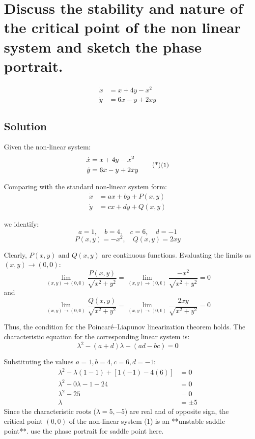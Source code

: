 \section{Discuss the stability and nature of the critical point of the non linear system and sketch the phase portrait.}
\begin{align*}
        \dot{x} &= x + 4y - x^2 \\
        \dot{y} &= 6x - y + 2xy
    \end{align*}
\subsection*{Solution}

Given the non-linear system:
\begin{equation}
    \begin{aligned}
        \dot{x} &= x + 4y - x^2 \\
        \dot{y} &= 6x - y + 2xy
    \end{aligned} \sidenote{1}
\end{equation}

Comparing with the standard non-linear system form:
\begin{align*}
    \dot{x} &= ax + by + P(x, y) \\
    \dot{y} &= cx + dy + Q(x, y)
\end{align*}

we identify:
\[a = 1, \quad b = 4, \quad c = 6, \quad d = -1\]
\[P(x, y) = -x^2, \quad Q(x, y) = 2xy\]

\noindent Clearly, $P(x, y)$ and $Q(x, y)$ are continuous functions.
Evaluating the limits as $(x, y) \to (0,0)$:
\[\lim_{(x, y) \to (0, 0)} \frac{P(x, y)}{\sqrt{x^2 + y^2}} = \lim_{(x, y) \to (0, 0)} \frac{-x^2}{\sqrt{x^2 + y^2}} = 0\]
and
\[\lim_{(x, y) \to (0, 0)} \frac{Q(x, y)}{\sqrt{x^2 + y^2}} = \lim_{(x, y) \to (0, 0)} \frac{2xy}{\sqrt{x^2 + y^2}} = 0\]

Thus, the condition for the Poincaré–Liapunov linearization theorem holds.
The characteristic equation for the corresponding linear system is:
\[\lambda^2 - (a + d)\lambda + (ad - bc) = 0\]

Substituting the values $a = 1, b = 4, c = 6, d = -1$:
\begin{align*}
    \lambda^2 - \lambda(1 - 1) + [1(-1) - 4(6)] &= 0 \\[0.5em]
    \lambda^2 - 0\lambda - 1 - 24 &= 0 \\[0.5em]
    \lambda^2 - 25 &= 0 \\[0.5em]
    \lambda &= \pm 5
\end{align*}
Since the characteristic roots ($\lambda = 5, -5$) are real and of opposite sign, the critical point $(0,0)$ of the non-linear system (1) is an **unstable saddle point**.
use the phase portrait for saddle point here.